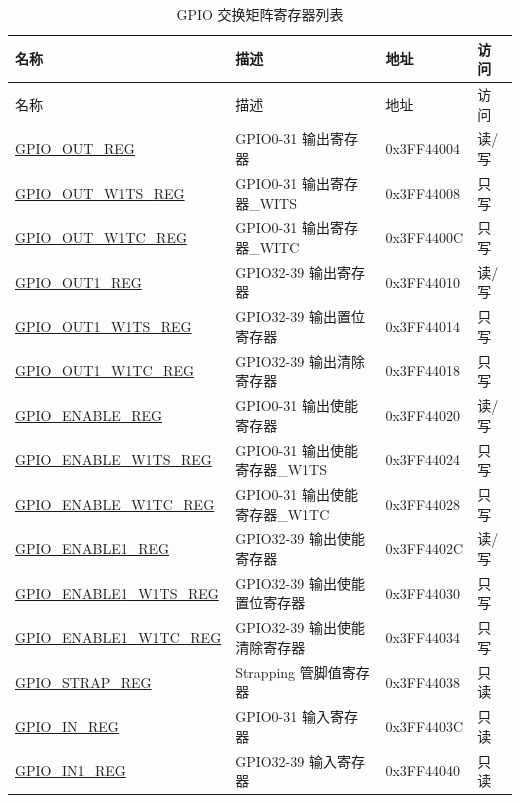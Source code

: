 \begin{longtable}{ | p{5.5cm} | p{7.5cm} | p{2cm} | p{1cm} | }
\caption{GPIO 交换矩阵寄存器列表}
\\\hline
\rowcolor{lightgray}
名称 & 描述 &  地址 & 访问 \\ \hline
\endfirsthead
\hline\rowcolor{lightgray}
名称 & 描述 &  地址 & 访问 \\ \hline
\endhead
\endfoot
\hyperref[regdesc:GPIOOUTREG]{GPIO\_OUT\_REG} & GPIO0-31 输出寄存器 & 0x3FF44004 & 读/写 \\ \hline
\hyperref[regdesc:GPIOOUTW1TSREG]{GPIO\_OUT\_W1TS\_REG} & GPIO0-31 输出寄存器\_WITS & 0x3FF44008 & 只写 \\ \hline
\hyperref[regdesc:GPIOOUTW1TCREG]{GPIO\_OUT\_W1TC\_REG} & GPIO0-31 输出寄存器\_WITC & 0x3FF4400C & 只写 \\ \hline
\hyperref[regdesc:GPIOOUT1REG]{GPIO\_OUT1\_REG} & GPIO32-39 输出寄存器 & 0x3FF44010 & 读/写 \\ \hline
\hyperref[regdesc:GPIOOUT1W1TSREG]{GPIO\_OUT1\_W1TS\_REG} & GPIO32-39 输出置位寄存器 & 0x3FF44014 & 只写\\ \hline
\hyperref[regdesc:GPIOOUT1W1TCREG]{GPIO\_OUT1\_W1TC\_REG} & GPIO32-39 输出清除寄存器 & 0x3FF44018 & 只写\\ \hline
\hyperref[regdesc:GPIOENABLEREG]{GPIO\_ENABLE\_REG} & GPIO0-31 输出使能寄存器 & 0x3FF44020 & 读/写 \\ \hline
\hyperref[regdesc:GPIOENABLEW1TSREG]{GPIO\_ENABLE\_W1TS\_REG} & GPIO0-31 输出使能寄存器\_W1TS & 0x3FF44024 & 只写 \\ \hline
\hyperref[regdesc:GPIOENABLEW1TCREG]{GPIO\_ENABLE\_W1TC\_REG} & GPIO0-31 输出使能寄存器\_W1TC & 0x3FF44028 & 只写 \\ \hline
\hyperref[regdesc:GPIOENABLE1REG]{GPIO\_ENABLE1\_REG} & GPIO32-39 输出使能寄存器 & 0x3FF4402C & 读/写 \\ \hline
\hyperref[regdesc:GPIOENABLE1W1TSREG]{GPIO\_ENABLE1\_W1TS\_REG} & GPIO32-39 输出使能置位寄存器 & 0x3FF44030 & 只写 \\ \hline
\hyperref[regdesc:GPIOENABLE1W1TCREG]{GPIO\_ENABLE1\_W1TC\_REG} & GPIO32-39 输出使能清除寄存器 & 0x3FF44034 & 只写 \\ \hline
\hyperref[regdesc:GPIOSTRAPREG]{GPIO\_STRAP\_REG} & Strapping 管脚值寄存器 & 0x3FF44038 & 只读 \\ \hline
\hyperref[regdesc:GPIOINREG]{GPIO\_IN\_REG} & GPIO0-31 输入寄存器 & 0x3FF4403C & 只读 \\ \hline
\hyperref[regdesc:GPIOIN1REG]{GPIO\_IN1\_REG} & GPIO32-39 输入寄存器 & 0x3FF44040 & 只读 \\ \hline

\end{longtable}
